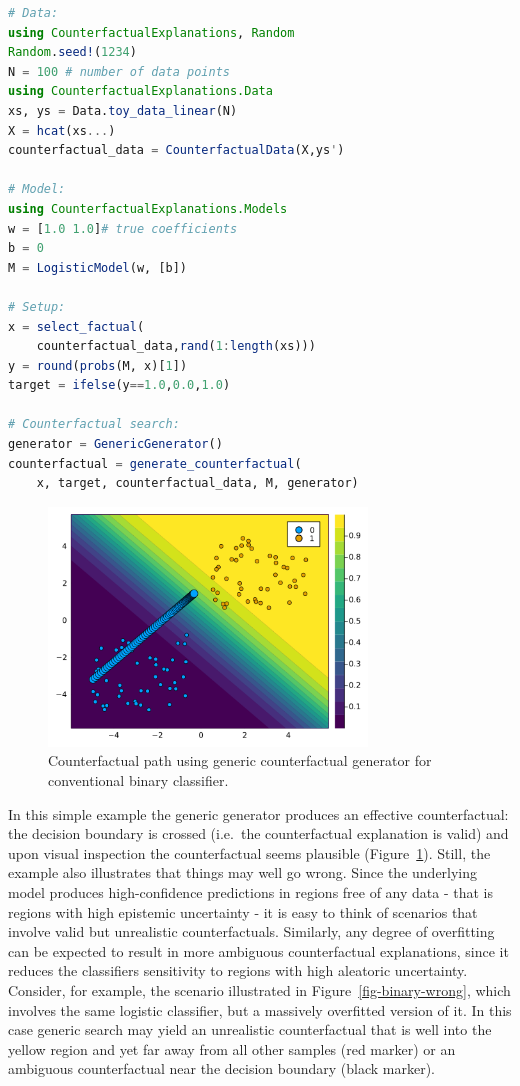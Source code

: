 \documentclass{juliacon}
\begin{document}
\begin{lstlisting}[language=Julia, escapechar=@, caption={A simple generic generator.},label={lst:generic}, captionpos=b] 
# Data:
using CounterfactualExplanations, Random
Random.seed!(1234)
N = 100 # number of data points
using CounterfactualExplanations.Data
xs, ys = Data.toy_data_linear(N)
X = hcat(xs...)
counterfactual_data = CounterfactualData(X,ys')

# Model:
using CounterfactualExplanations.Models 
w = [1.0 1.0]# true coefficients
b = 0
M = LogisticModel(w, [b])

# Setup:
x = select_factual(
    counterfactual_data,rand(1:length(xs)))
y = round(probs(M, x)[1])
target = ifelse(y==1.0,0.0,1.0) 

# Counterfactual search:
generator = GenericGenerator()
counterfactual = generate_counterfactual(
    x, target, counterfactual_data, M, generator)
\end{lstlisting}

\begin{figure}

{\centering \includegraphics[width=3.33333in,height=2.5in]{www/ce_binary.png}

}

\caption{\label{fig-binary}Counterfactual path using generic
counterfactual generator for conventional binary classifier.}

\end{figure}

In this simple example the generic generator produces an effective
counterfactual: the decision boundary is crossed (i.e.~the
counterfactual explanation is valid) and upon visual inspection the
counterfactual seems plausible (Figure~\ref{fig-binary}). Still, the
example also illustrates that things may well go wrong. Since the
underlying model produces high-confidence predictions in regions free of
any data - that is regions with high epistemic uncertainty - it is easy
to think of scenarios that involve valid but unrealistic
counterfactuals. Similarly, any degree of overfitting can be expected to
result in more ambiguous counterfactual explanations, since it reduces
the classifiers sensitivity to regions with high aleatoric uncertainty.
Consider, for example, the scenario illustrated in
Figure~\ref{fig-binary-wrong}, which involves the same logistic
classifier, but a massively overfitted version of it. In this case
generic search may yield an unrealistic counterfactual that is well into
the yellow region and yet far away from all other samples (red marker)
or an ambiguous counterfactual near the decision boundary (black
marker).
\end{document}
